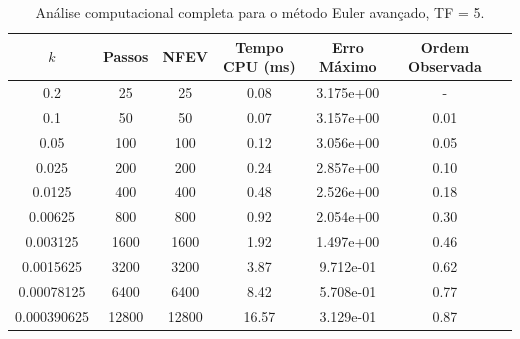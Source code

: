 \begin{table}[H]
    \centering
    \begin{tabular}{ccccccc}
        \hline
        $k$ & Passos & NFEV & Tempo CPU (ms) & Erro Máximo & Ordem Observada \\
        \hline
        0.2 & 25 & 25 & 0.08  & 3.175e+00 & - \\
        0.1 & 50 & 50 & 0.07  & 3.157e+00 & 0.01 \\
        0.05 & 100 & 100 & 0.12  & 3.056e+00 & 0.05 \\
        0.025 & 200 & 200 & 0.24  & 2.857e+00 & 0.10 \\
        0.0125 & 400 & 400 & 0.48  & 2.526e+00 & 0.18 \\
        0.00625 & 800 & 800 & 0.92  & 2.054e+00 & 0.30 \\
        0.003125 & 1600 & 1600 & 1.92  & 1.497e+00 & 0.46 \\
        0.0015625 & 3200 & 3200 & 3.87  & 9.712e-01 & 0.62 \\
        0.00078125 & 6400 & 6400 & 8.42  & 5.708e-01 & 0.77 \\
        0.000390625 & 12800 & 12800 & 16.57  & 3.129e-01 & 0.87 \\
        \hline
    \end{tabular}
    \caption{Análise computacional completa para o método Euler avançado, TF = 5.}
    \label{tab:erros_euler_avancado,_tf_=_5}
\end{table}
